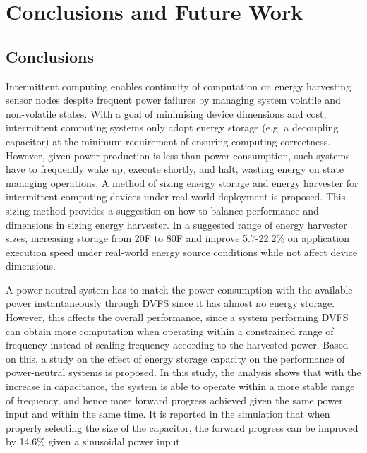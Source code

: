 \chapter{Conclusions and Future Work} \label{Chapter:Conclusion}

\section{Conclusions} 

Intermittent computing enables continuity of computation on energy harvesting sensor nodes despite frequent power failures by managing system volatile and non-volatile states. With a goal of minimising device dimensions and cost, intermittent computing systems only adopt energy storage (e.g. a decoupling capacitor) at the minimum requirement of ensuring computing correctness. However, given power production is less than power consumption, such systems have to frequently wake up, execute shortly, and halt, wasting energy on state managing operations. A method of sizing energy storage and energy harvester for intermittent computing devices under real-world deployment is proposed. This sizing method provides a suggestion on how to balance performance and dimensions in sizing energy harvester. In a suggested range of energy harvester sizes, increasing storage from 20\textmu F to 80\textmu F and improve 5.7-22.2\% on application execution speed under real-world energy source conditions while not affect device dimensions. 

A power-neutral system has to match the power consumption with the available power instantaneously through DVFS since it has almost no energy storage. However, this affects the overall performance, since a system performing DVFS can obtain more computation when operating within a constrained range of frequency instead of scaling frequency according to the harvested power. Based on this, a study on the effect of energy storage capacity on the performance of power-neutral systems is proposed. In this study, the analysis shows that with the increase in capacitance, the system is able to operate within a more stable range of frequency, and hence more forward progress achieved given the same power input and within the same time. It is reported in the simulation that when properly selecting the size of the capacitor, the forward progress can be improved by 14.6\% given a sinusoidal power input.

